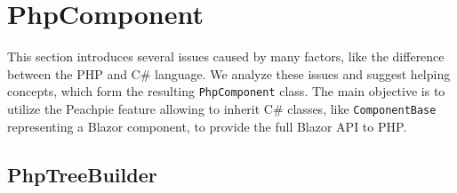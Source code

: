 \section{PhpComponent}

This section introduces several issues caused by many factors, like the difference between the PHP and C\# language.
We analyze these issues and suggest helping concepts, which form the resulting \texttt{PhpComponent} class.
The main objective is to utilize the Peachpie feature allowing to inherit C\# classes, like \texttt{ComponentBase} representing a Blazor component, to provide the full Blazor API to PHP.

\subsection{PhpTreeBuilder}

